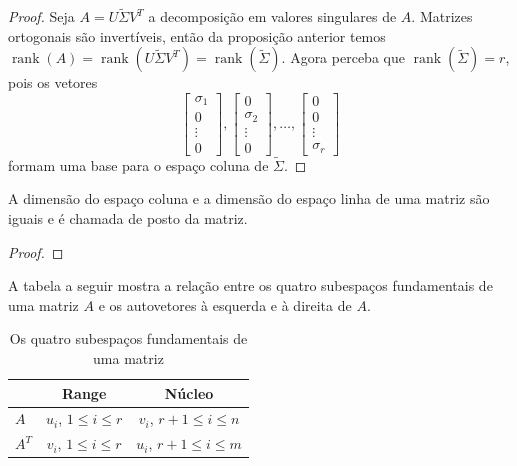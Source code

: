 \documentclass{article}
\DeclareMathOperator{\rank}{rank}
\begin{document}
\begin{proof}
    Seja \(A = U\tilde{\Sigma}V^T\) a decomposição em valores singulares de \(A\). Matrizes ortogonais são invertíveis, então da proposição anterior temos \(\rank(A) = \rank(U\tilde{\Sigma}V^T)= \rank(\tilde{\Sigma})\). Agora perceba que \(\rank(\tilde{\Sigma})=r\), pois os vetores 
    \[
        \begin{bmatrix}
            \sigma_1 \\
            0 \\
            \vdots \\
            0
        \end{bmatrix}, 
        \begin{bmatrix}
            0 \\
            \sigma_2 \\
            \vdots \\
            0
        \end{bmatrix}, 
        \ldots, 
        \begin{bmatrix}
            0 \\
            0 \\
            \vdots \\
            \sigma_r
        \end{bmatrix}
    \] formam uma base para o espaço coluna de \(\tilde{\Sigma}\).
\end{proof}

\begin{prop}
    A dimensão do espaço coluna e a dimensão do espaço linha de uma matriz são iguais e é chamada de posto da matriz.
\end{prop}

\begin{proof}
    
\end{proof}

A tabela a seguir mostra a relação entre os quatro subespaços fundamentais de uma matriz \(A\) e os autovetores à esquerda e à direita de \(A\).

\begin{table}
    \centering
    \caption{Os quatro subespaços fundamentais de uma matriz}
    \begin{tabular}{lcc}
        \toprule
        & \textbf{Range} & \textbf{Núcleo} \\
        \midrule
        \(A\) & \(u_i\), \(1 \leq i \leq r\) & \(v_i\), \(r+1 \leq i \leq n\) \\
        \(A^T\) & \(v_i\), \(1 \leq i \leq r\) & \(u_i\), \(r+1 \leq i \leq m\) \\
        \bottomrule
    \end{tabular}    
\end{table}
\end{document}
